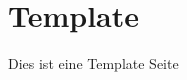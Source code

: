 \documentclass[main.tex]{subfiles}
\begin{document}
\newpage
\section{Template}

Dies ist eine Template Seite

\blinddocument
\end{document}
